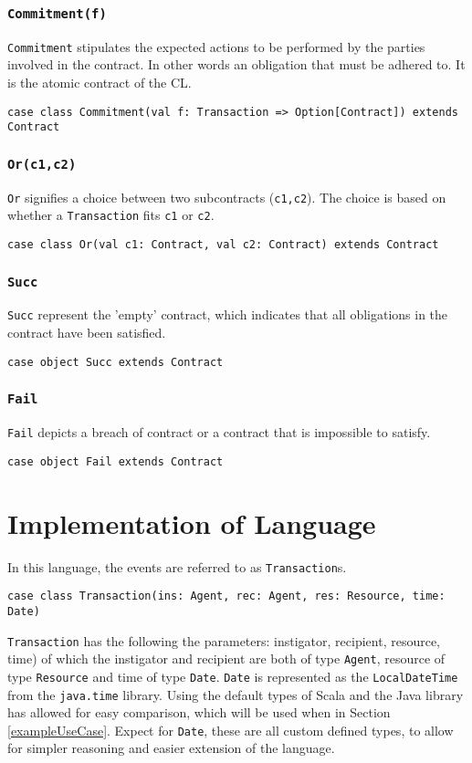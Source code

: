 \documentclass{ituthesis}
\begin{document}
\subsubsection{\texttt{\textbf{Commitment(f)}}}
\texttt{Commitment} stipulates the expected actions to be performed by the parties involved in the contract. In other words an obligation that must be adhered to. It is the atomic contract of the CL. 
\begin{lstlisting}
case class Commitment(val f: Transaction => Option[Contract]) extends Contract
\end{lstlisting}

\subsubsection{\texttt{\textbf{Or(c1,c2)}}}
\texttt{Or} signifies a choice between two subcontracts (\texttt{c1,c2}). The choice is based on whether a \texttt{Transaction} fits \texttt{c1} or \texttt{c2}.
\begin{lstlisting}
case class Or(val c1: Contract, val c2: Contract) extends Contract
\end{lstlisting}

\subsubsection{\texttt{\textbf{Succ}}}
\texttt{Succ} represent the 'empty' contract, which indicates that all obligations in the contract have been satisfied.
\begin{lstlisting}
case object Succ extends Contract
\end{lstlisting}

\subsubsection{\texttt{\textbf{Fail}}}
\texttt{Fail} depicts a breach of contract or a contract that is impossible to satisfy.
\begin{lstlisting}
case object Fail extends Contract
\end{lstlisting}

\section{Implementation of Language} \label{implementation}
In this language, the events are referred to as \texttt{Transaction}s.
\begin{lstlisting}
case class Transaction(ins: Agent, rec: Agent, res: Resource, time: Date)
\end{lstlisting}
\texttt{Transaction} has the following the parameters: instigator, recipient, resource, time) of which the instigator and recipient are both of type \texttt{Agent}, resource of type \texttt{Resource} and time of type \texttt{Date}. \texttt{Date} is represented as the \texttt{LocalDateTime} from the \texttt{java.time} library. Using the default types of Scala and the Java library has allowed for easy comparison, which will be used when in Section \ref{exampleUseCase}. Expect for \texttt{Date}, these are all custom defined types, to allow for simpler reasoning and easier extension of the language.
\end{document}
